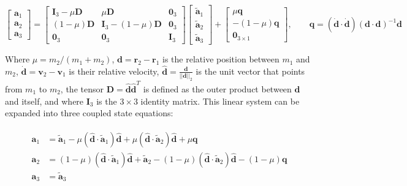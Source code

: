 \documentclass[]{article}
\newcommand{\norm}[1]{\left| \left| #1 \right| \right|_{2}}
\begin{document}
	\begin{equation*}
		\begin{bmatrix}
			\mathbf{a}_1 \\ \mathbf{a}_2 \\ \mathbf{a}_3
		\end{bmatrix} = \begin{bmatrix}
			\mathbf{I}_3 - \mu \mathbf{D} & \mu \mathbf{D} & \mathbf{0}_3 \\
			(1 - \mu) \mathbf{D} & 	\mathbf{I}_3 - (1 - \mu) \mathbf{D} & \mathbf{0}_3 \\
			\mathbf{0}_3 & \mathbf{0}_3 & \mathbf{I}_3
		\end{bmatrix} \begin{bmatrix}
			\tilde{\mathbf{a}}_1 \\ \tilde{\mathbf{a}}_2 \\ \tilde{\mathbf{a}}_3
		\end{bmatrix} + \begin{bmatrix}
			\mu \mathbf{q} \\
			-(1 - \mu) \mathbf{q} \\
			\mathbf{0}_{3\times 1}
		\end{bmatrix}, \quad \quad \mathbf{q} = (\dot{\mathbf{d}}\cdot \dot{\mathbf{d}}) (\mathbf{d} \cdot \mathbf{d})^{-1} \mathbf{d}
	\end{equation*}

	Where $\mu = m_2 / (m_1 + m_2)$, $\mathbf{d} = \mathbf{r}_2 - \mathbf{r}_1$ is the relative position between $m_1$ and $m_2$, $\dot{\mathbf{d}} = \mathbf{v}_2 - \mathbf{v}_1$ is their relative velocity, $\hat{\mathbf{d}} = \frac{\mathbf{d}}{\norm{\mathbf{d}}}$ is the unit vector that points from $m_1$ to $m_2$, the tensor $\mathbf{D} = \hat{\mathbf{d}}\hat{\mathbf{d}}^T$ is defined as the outer product between $\hat{\mathbf{d}}$ and itself, and where $\mathbf{I}_3$ is the $3\times 3$ identity matrix.  This linear system can be expanded into three coupled state equations:

	\begin{align*}
	\begin{split}
		\mathbf{a}_1 &= \tilde{\mathbf{a}}_1 - \mu  (\hat{\mathbf{d}} \cdot \tilde{\mathbf{a}}_1) \hat{\mathbf{d}} + \mu  (\hat{\mathbf{d}}\cdot  \tilde{\mathbf{a}}_2) \hat{\mathbf{d}} + \mu \mathbf{q} \\
		\mathbf{a}_2 &= (1 - \mu) (\hat{\mathbf{d}} \cdot \tilde{\mathbf{a}}_1) \hat{\mathbf{d}} + \tilde{\mathbf{a}}_2 - (1 - \mu) (\hat{\mathbf{d}}\cdot  \tilde{\mathbf{a}}_2) \hat{\mathbf{d}} - (1-\mu) \mathbf{q} \\
		\mathbf{a}_3 &= \tilde{\mathbf{a}}_3 \\
	\end{split}
	\end{align*}
\end{document}
